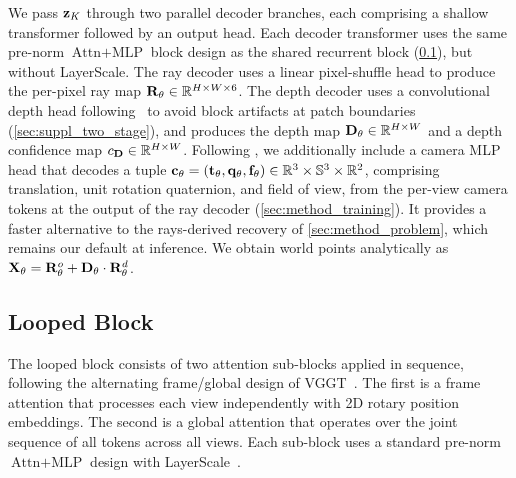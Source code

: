 We pass $\mathbf{z}_K$ through two parallel decoder branches, each comprising a shallow transformer followed by an output head.
Each decoder transformer uses the same pre-norm $\text{Attn}+\text{MLP}$ block design as the shared recurrent block (\cref{sec:method_recurrence}), but without LayerScale.
The ray decoder uses a linear pixel-shuffle head to produce the per-pixel ray map $\mathbf{R}_\theta \in \mathbb{R}^{H \times W \times 6}$.
The depth decoder uses a convolutional depth head following~\citet{wang2025moge} to avoid block artifacts at patch boundaries (\cref{sec:suppl_two_stage}), and produces the depth map $\mathbf{D}_\theta \in \mathbb{R}^{H \times W}$ and a depth confidence map $c_{\mathbf{D}} \in \mathbb{R}^{H \times W}$.
Following \citet{lin2025depth}, we additionally include a camera MLP head that decodes a tuple $\mathbf{c}_\theta = (\mathbf{t}_\theta, \mathbf{q}_\theta, \mathbf{f}_\theta) \in \mathbb{R}^3 \times \mathbb{S}^3 \times \mathbb{R}^2$, comprising translation, unit rotation quaternion, and field of view, from the per-view camera tokens at the output of the ray decoder (\cref{sec:method_training}). It provides a faster alternative to the rays-derived recovery of \cref{sec:method_problem}, which remains our default at inference.
We obtain world points analytically as $\mathbf{X}_\theta = \mathbf{R}_\theta^o + \mathbf{D}_\theta \cdot \mathbf{R}_\theta^d$.




\subsection{Looped Block}
\label{sec:method_recurrence}

The looped block consists of two attention sub-blocks applied in sequence, following the alternating frame/global design of VGGT~\citep{vggt}.
The first is a frame attention that processes each view independently with 2D rotary position embeddings.
The second is a global attention that operates over the joint sequence of all tokens across all views.
Each sub-block uses a standard pre-norm $\text{Attn}+\text{MLP}$ design with LayerScale~\citep{touvron2021going}.

